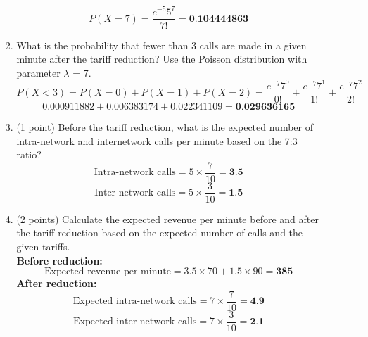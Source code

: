 \documentclass[a3paper,12pt]{article} %
\begin{document}
\begin{enumerate}
\begin{enumerate}
\begin{enumerate}
            \[
                P(X = 7) = \frac{e^{-5} 5^7}{7!} = \textbf{0.104444863}
            \]
            \item What is the probability that fewer than 3 calls are made in a given minute after the tariff reduction? Use the Poisson distribution with parameter \(\lambda\) = 7.
            \[
                P(X < 3) = P(X = 0) + P(X = 1) + P(X = 2) = \frac{e^{-7} 7^0}{0!} + \frac{e^{-7} 7^1}{1!} + \frac{e^{-7} 7^2}{2!}
            \]
            \[
                0.000911882 + 0.006383174 + 0.022341109 = \textbf{0.029636165}
            \]
            \item (1 point) Before the tariff reduction, what is the expected number of intra-network and internetwork
            calls per minute based on the 7:3 ratio?
            \[
                \text{Intra-network calls} = 5 \times \frac{7}{10} = \textbf{3.5}
            \]
            \[
                \text{Inter-network calls} = 5 \times \frac{3}{10} = \textbf{1.5}
            \]
            \item (2 points) Calculate the expected revenue per minute before and after the tariff reduction based on the expected number of calls and the given tariffs.
            \\ \textbf{Before reduction:}
            \[
                \text{Expected revenue per minute} = 3.5 \times 70 + 1.5 \times 90 = \textbf{385}
            \]
            \textbf{After reduction:}
            \[
                \text{Expected intra-network calls} = 7 \times \frac{7}{10} = \textbf{4.9}
            \]
            \[
                \text{Expected inter-network calls} = 7 \times \frac{3}{10} = \textbf{2.1}
            \]


\end{enumerate}
\end{enumerate}
\end{enumerate}
\end{document}
